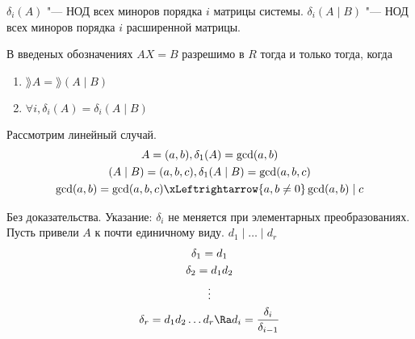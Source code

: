 \begin{Def}
	$\delta_i(A)$ "--- НОД всех миноров порядка $i$ матрицы системы.
	$\delta_i(A \mid B) $ "--- НОД всех миноров порядка $i$ расширенной матрицы.
\end{Def}
\begin{theorem}
	В введеных обозначениях $AX = B$ разрешимо в $R$ тогда и только тогда, когда
	\begin{enumerate}
		\item $\rang A = \rang (A \mid B)$
		\item $\forall i, \delta_i(A) = \delta_i(A \mid B)$
	\end{enumerate}
\end{theorem}
\begin{Rem}
	Рассмотрим линейный случай.
	\begin{gather*}
		A = (a, b), \delta_1(A) = \gcd(a, b) \\
		(A \mid B) = (a, b, c), \delta_1(A \mid B) = \gcd(a, b, c) \\
		\gcd(a, b) = \gcd(a, b, c) \xLeftrightarrow{a, b \ne 0} \gcd(a, b) \mid c
	\end{gather*}
\end{Rem}
Без доказательства.
Указание: $\delta_i$ не меняется при элементарных преобразованиях.
Пусть привели $A$ к почти единичному виду. $d_1 \mid \dots \mid d_r$
\begin{gather*}
	\delta_1 = d_1 \\
	\delta_2 = d_1d_2 \\
	\vdots \\
	\delta_r = d_1d_2 \dots d_r \Ra d_i = \frac{\delta_i}{\delta_{i - 1}}
\end{gather*}

